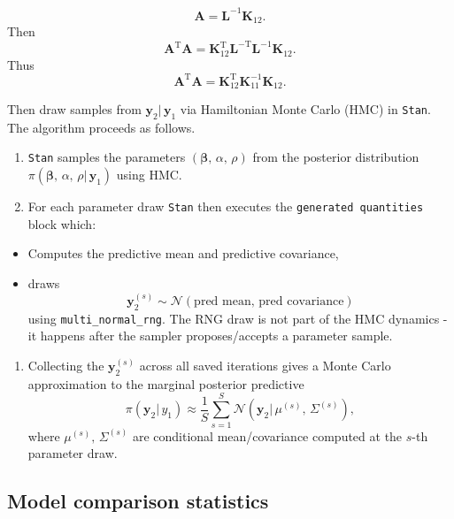 \documentclass[
]{article}
\providecommand{\tightlist}{%
  \setlength{\itemsep}{0pt}\setlength{\parskip}{0pt}}
\begin{document}
\[\mathbf{A} = \mathbf{L}^{-1} \mathbf{K}_{12}.\] Then
\[\mathbf{A}^{\text{T}} \mathbf{A} = \mathbf{K}_{12}^{\text{T}} \mathbf{L}^{-\text{T}} \mathbf{L}^{-1} \mathbf{K}_{12}.\]
Thus
\[\mathbf{A}^{\text{T}} \mathbf{A} = \mathbf{K}_{12}^{\text{T}} \mathbf{K}_{11}^{-1} \mathbf{K}_{12}.\]

Then draw samples from \(\mathbf{y}_{2}|\, \mathbf{y}_{1}\) via
Hamiltonian Monte Carlo (HMC) in \texttt{Stan}. The algorithm proceeds
as follows.

\begin{enumerate}
\def\labelenumi{\arabic{enumi}.}
\item
  \texttt{Stan} samples the parameters
  \((\boldsymbol{\beta},\, \alpha,\, \rho)\) from the posterior
  distribution
  \(\pi(\boldsymbol{\beta},\, \alpha,\, \rho|\, \mathbf{y}_{1})\) using
  HMC.
\item
  For each parameter draw \texttt{Stan} then executes the
  \texttt{generated\ quantities} block which:
\end{enumerate}

\begin{itemize}
\tightlist
\item
  Computes the predictive mean and predictive covariance,
\item
  draws
  \[\mathbf{y}_{2}^{(s)} \sim \mathcal{N}(\text{pred mean},\, \text{pred covariance})\]
  using \texttt{multi\_normal\_rng}. The RNG draw is not part of the HMC
  dynamics - it happens after the sampler proposes/accepts a parameter
  sample.
\end{itemize}

\begin{enumerate}
\def\labelenumi{\arabic{enumi}.}
\setcounter{enumi}{2}
\tightlist
\item
  Collecting the \(\mathbf{y}_{2}^{(s)}\) across all saved iterations
  gives a Monte Carlo approximation to the marginal posterior predictive
  \[\pi(\mathbf{y}_{2}|\, y_{1}) \approx \frac{1}{S} \sum_{s=1}^{S} \mathcal{N}(\mathbf{y}_{2}|\, \mu^{(s)},\, \Sigma^{(s)}),\]
  where \(\mu^{(s)},\, \Sigma^{(s)}\) are conditional mean/covariance
  computed at the \(s\)-th parameter draw.
\end{enumerate}

\subsection{Model comparison
statistics}\label{model-comparison-statistics}
\end{document}
